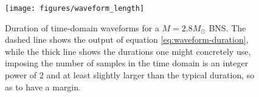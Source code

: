 \documentclass[main.tex]{subfiles}
\begin{document}
\begin{figure}[ht]
\centering
\texttt{[image: figures/waveform\_length]}
\caption{Duration of time-domain waveforms for a \(M = 2.8 M_{\odot}\) \ac{BNS}. The dashed line shows the output of equation \eqref{eq:waveform-duration}, while the thick line shows the durations one might concretely use, imposing the number of samples in the time domain is an integer power of 2 and at least slightly larger than the typical duration, so as to have a margin.}
\label{fig:waveform_length}
\end{figure}




\end{document}
